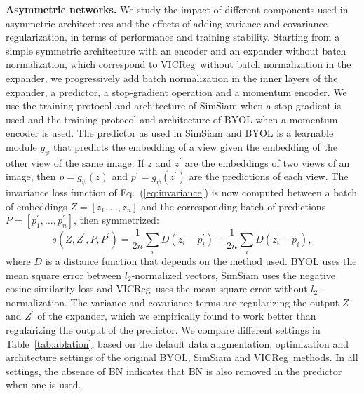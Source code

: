 \documentclass{article} %
\newcommand{\algo}{VICReg}
\newcommand{\expander}{expander }
\newcommand{\expandernospace}{expander}
\begin{document}
\vspace{2mm}
\textbf{Asymmetric networks.} \label{sec:ablation_asymetric} We study the impact of different components used in asymmetric architectures and the effects of adding variance and covariance regularization, in terms of performance and training stability. Starting from a simple symmetric architecture with an encoder and an \expander without batch normalization, which correspond to \algo \ without batch normalization in the \expandernospace, we progressively add batch normalization in the inner layers of the \expandernospace, a predictor, a stop-gradient operation and a momentum encoder. We use the training protocol and architecture of SimSiam \cite{chen2020simsiam} when a stop-gradient is used and the training protocol and architecture of BYOL \cite{grill2020byol} when a momentum encoder is used. The predictor as used in SimSiam and BYOL is a learnable module $g_{\psi}$ that predicts the embedding of a view given the embedding of the other view of the same image. If $z$ and $z^{\prime}$ are the embeddings of two views of an image, then $p = g_{\psi}(z)$ and $p^{\prime} = g_{\psi}(z^{\prime})$ are the predictions of each view. The invariance loss function of Eq.~(\ref{eq:invariance}) is now computed between a batch of embeddings $Z = [z_1, \dots, z_n]$ and the corresponding batch of predictions $P = [p_1^{\prime}, \dots, p_n^{\prime}]$, then symmetrized:
\begin{equation}
    s(Z, Z^{\prime}, P, P^{\prime}) = \frac{1}{2n} \sum_i D(z_i - p^{\prime}_i) + \frac{1}{2n} \sum_i D(z^{\prime}_i - p_i),
\end{equation}
where $D$ is a distance function that depends on the method used. BYOL uses the mean square error between $l_2$-normalized vectors, SimSiam uses the negative cosine similarity loss and \algo \ uses the mean square error without $l_2$-normalization. The variance and covariance terms are regularizing the output $Z$ and $Z^{\prime}$ of the \expandernospace, which we empirically found to work better than regularizing the output of the predictor. We compare different settings in Table~\ref{tab:ablation}, based on the default data augmentation, optimization and architecture settings of the original BYOL, SimSiam and \algo \ methods. In all settings, the absence of BN indicates that BN is also removed in the predictor when one is used.
\end{document}
